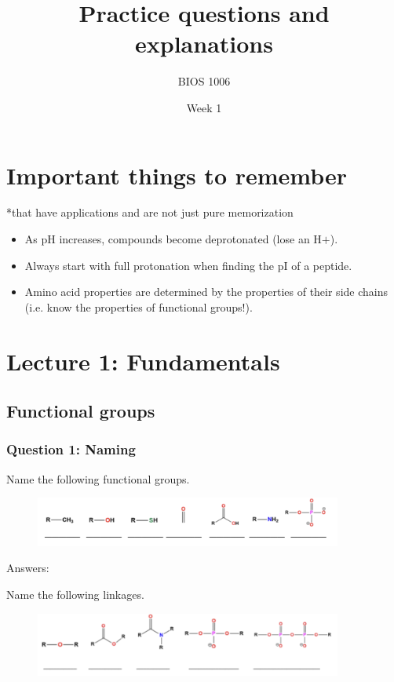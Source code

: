 \documentclass[letterpaper, 12pt]{article}
\title{Practice questions and explanations}
\author{BIOS 1006}
\date{Week 1}
\begin{document}
\maketitle

\section*{Important things to remember}
*that have applications and are not just pure memorization

\begin{itemize}
\item As pH increases, compounds become deprotonated (lose an H$+$).
\item Always start with full protonation when finding the pI of a peptide.
\item Amino acid properties are determined by the properties of their side chains (i.e. know the properties of functional groups!).
\end{itemize}

\section*{Lecture 1: Fundamentals}

\subsection*{Functional groups}

\subsubsection*{Question 1: Naming}
Name the following functional groups.

\begin{figure}[H]
\centering
\includegraphics[width=0.9\textwidth]{functionalgroups}
\end{figure}

Answers:


Name the following linkages.

\begin{figure}[H]
\centering
\includegraphics[width=0.9\textwidth]{linkages}
\end{figure}
\end{document}
